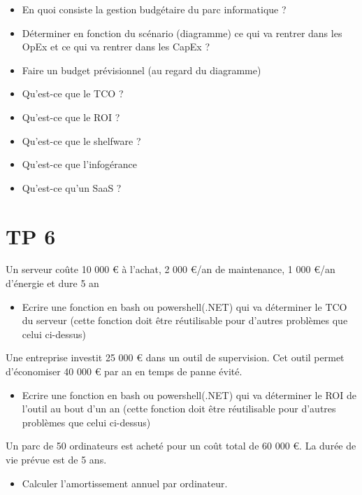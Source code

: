 \documentclass[12pt, letterpaper]{article}
\begin{document}
\begin{itemize}
    \item En quoi consiste la gestion budgétaire du parc informatique ? 
    \item Déterminer en fonction du scénario (diagramme) ce qui va rentrer dans les OpEx et ce qui va rentrer dans les CapEx ?
    \item Faire un budget prévisionnel (au regard du diagramme)
    \item Qu'est-ce que le TCO ?
    \item Qu'est-ce que le ROI ?
    \item Qu'est-ce que le shelfware ?
    \item Qu'est-ce que l'infogérance
    \item Qu'est-ce qu'un SaaS ?
\end{itemize}



\section{TP 6}

\begin{tcolorbox}
    Un serveur coûte 10 000 € à l’achat, 2 000 €/an de maintenance, 1 000 €/an d’énergie
et dure 5 an
    \begin{itemize}
        \item Ecrire une fonction en bash ou powershell(.NET) qui va déterminer le TCO du serveur (cette fonction doit être réutilisable pour d'autres problèmes que celui ci-dessus)
    \end{itemize}
\end{tcolorbox}

\begin{tcolorbox}
    Une entreprise investit 25 000 € dans un outil de supervision.  
Cet outil permet d’économiser 40 000 € par an en temps de panne évité.  
 \begin{itemize}
        \item Ecrire une fonction en bash ou powershell(.NET) qui va déterminer le ROI de l'outil au bout d'un an (cette fonction doit être réutilisable pour d'autres problèmes que celui ci-dessus)
    \end{itemize}
\end{tcolorbox}

\begin{tcolorbox}
    Un parc de 50 ordinateurs est acheté pour un coût total de 60 000 €. La durée de vie prévue est
de 5 ans.
\begin{itemize}
    \item Calculer l’amortissement annuel par ordinateur.
\end{itemize}
\end{tcolorbox}
\end{document}
